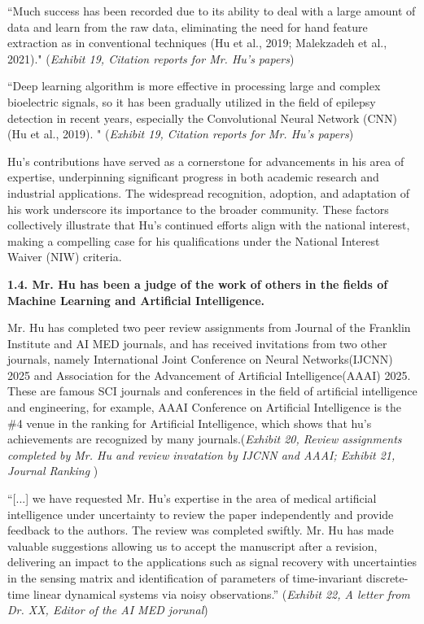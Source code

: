 \documentclass{article}
\begin{document}
“Much success has been recorded due to its ability to deal with a large amount of data and learn from the raw data, eliminating the need for hand feature extraction as in conventional techniques (Hu et al., 2019; Malekzadeh et al., 2021)."  ({\it Exhibit 19, Citation reports for Mr. Hu’s papers})

“Deep learning algorithm is more effective in processing large and complex bioelectric signals, so it has been gradually utilized in the field of epilepsy detection in recent years, especially the Convolutional Neural Network (CNN) (Hu et al., 2019). "  ({\it Exhibit 19, Citation reports for Mr. Hu’s papers})

Hu’s contributions have served as a cornerstone for advancements in his area of expertise, underpinning significant progress in both academic research and industrial applications. The widespread recognition, adoption, and adaptation of his work underscore its importance to the broader community. These factors collectively illustrate that Hu’s continued efforts align with the national interest, making a compelling case for his qualifications under the National Interest Waiver (NIW) criteria.


{\bf 1.4. Mr. Hu has been a judge of the work of others in the fields of Machine Learning and Artificial Intelligence. }

Mr. Hu has completed two peer review assignments from Journal of the Franklin Institute and AI MED journals, and has received invitations from two other journals, namely International Joint Conference on Neural Networks(IJCNN) 2025 and Association for the Advancement of Artificial Intelligence(AAAI) 2025. These are famous SCI journals and conferences in the field of artificial intelligence and engineering, for example, AAAI Conference on Artificial Intelligence is the \#4 venue in the ranking for Artificial Intelligence, which shows that hu's achievements are recognized by many journals.({\it Exhibit 20, Review assignments completed by Mr. Hu and review invatation by IJCNN and AAAI; \it Exhibit 21, Journal Ranking })


“[...] we have requested Mr. Hu’s expertise in the area of medical artificial intelligence under uncertainty to review the paper independently and provide feedback to the authors. The review was completed swiftly. Mr. Hu has made valuable suggestions allowing us to accept the manuscript after a revision, delivering an impact to the applications such as signal recovery with uncertainties in the sensing matrix and identification of parameters of time-invariant discrete-time linear dynamical systems via noisy observations.” ({\it Exhibit 22, A letter from Dr. XX, Editor of the AI MED jorunal}) 
\end{document}
